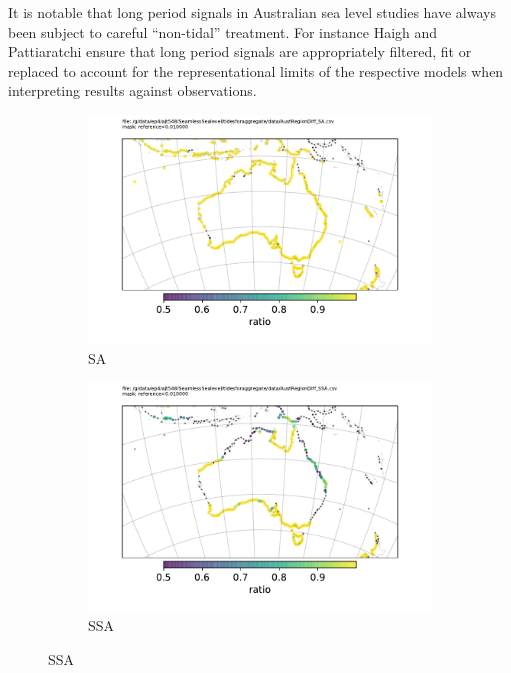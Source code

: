 It is notable that long period signals in Australian sea level studies have always been subject to careful ``non-tidal'' treatment. For instance Haigh \citep{Haigh:2013bn} and Pattiaratchi \citep{Pattiaratchi2018} ensure that long period signals are appropriately filtered, fit or replaced to account for the representational limits of the respective models when interpreting results against observations.

\begin{figure}[h]\centering
    \begin{subfigure}[b]{\figwidthHalf}
        \includegraphics[width=\textwidth]{figures/maps/AustRegionDiff_SA.pdf}
        \caption{SA}
    \end{subfigure}
    \begin{subfigure}[b]{\figwidthHalf}
        \includegraphics[width=\textwidth]{figures/maps/AustRegionDiff_SSA.pdf}
        \caption{SSA}

\end{subfigure}
\end{figure}
